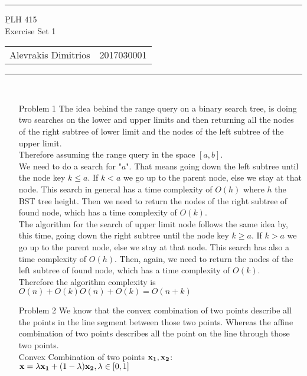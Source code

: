 \documentclass[11pt]{article}
\begin{document}
	\noindent\rule{\textwidth}{2pt}
	\begin{center}
		{\b PLH 415} \\
		Exercise Set 1\\
		\begin{tabular}{ c c }
			Alevrakis Dimitrios & 2017030001
		\end{tabular}
	\end{center}
	\rule{\textwidth}{.5pt}%
	\\
	\noindent
	\begin{enumerate}
		\item [Problem 1]
		The idea behind the range query on a binary search tree, is doing two searches on the lower and upper limits and then returning all the nodes of the right subtree of lower limit and the nodes of the left subtree of the upper limit.\\
		Therefore assuming the range query in the space $[a,b]$.\\
		We need to do a search for "$a$". That means going down the left subtree until the node key $k\leq a$. If $k<a$ we go up to the parent node, else we stay at that node. This search in general has a time complexity of $O(h)$ where $h$ the BST tree height. Then we need to return the nodes of the right subtree of found node, which has a time complexity of $O(k)$.\\
		The algorithm for the search of upper limit node follows the same idea by, this time, going down the right subtree until the node key $k\geq a$. If $k>a$ we go up to the parent node, else we stay at that node. This search has also a time complexity of $O(h)$. Then, again, we need to return the nodes of the left subtree of found node, which has a time complexity of $O(k)$.\\
		
		Therefore the algorithm complexity is $O(n)+O(k)O(n)+O(k)=O(n+k)$
		
		\item[Problem 2]
		We know that the convex combination of two points describe all the points in the line segment between those two points. Whereas the affine combination of two points describes all the point on the line through those two points.\\
		
		Convex Combination of two points ${\bf x_1},{\bf x_2}$:\\
		$\displaystyle {\bf x}=\lambda{\bf x_1} + (1-\lambda){\bf x_2},\lambda\in[0,1]$\\
		

\end{enumerate}
\end{document}
